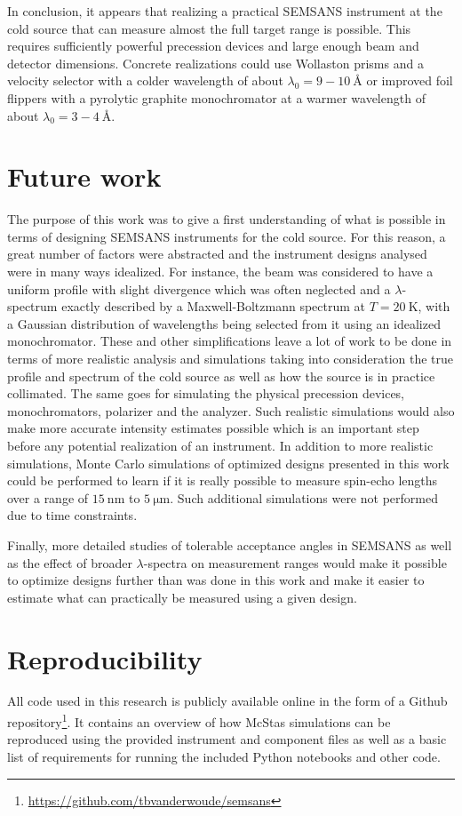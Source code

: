 In conclusion, it appears that realizing a practical SEMSANS instrument at the cold source that can measure almost the full target range is possible. This requires sufficiently powerful precession devices and large enough beam and detector dimensions. Concrete realizations could use Wollaston prisms and a velocity selector with a colder wavelength of about $\lambda_0 = 9 - 10~\unit{\angstrom}$ or improved foil flippers with a pyrolytic graphite monochromator at a warmer wavelength of about $\lambda_0 = 3 - 4~\unit{\angstrom}$.

\section{Future work}
The purpose of this work was to give a first understanding of what is possible in terms of designing SEMSANS instruments for the cold source. For this reason, a great number of factors were abstracted and the instrument designs analysed were in many ways idealized. For instance, the beam was considered to have a uniform profile with slight divergence which was often neglected and a $\lambda$-spectrum exactly described by a Maxwell-Boltzmann spectrum at $T= \SI{20}{\kelvin}$, with a Gaussian distribution of wavelengths being selected from it using an idealized monochromator. These and other simplifications leave a lot of work to be done in terms of more realistic analysis and simulations taking into consideration the true profile and spectrum of the cold source as well as how the source is in practice collimated. The same goes for simulating the physical precession devices, monochromators, polarizer and the analyzer. Such realistic simulations would also make more accurate intensity estimates possible which is an important step before any potential realization of an instrument. In addition to more realistic simulations, Monte Carlo simulations of optimized designs presented in this work could be performed to learn if it is really possible to measure spin-echo lengths over a range of $\SI{15}{\nano\meter}$ to $\SI{5}{\micro\meter}$. Such additional simulations were not performed due to time constraints.

Finally, more detailed studies of tolerable acceptance angles in SEMSANS as well as the effect of broader $\lambda$-spectra on measurement ranges would make it possible to optimize designs further than was done in this work and make it easier to estimate what can practically be measured using a given design.

\section{Reproducibility}
All code used in this research is publicly available online in the form of a Github repository\footnote{\url{https://github.com/tbvanderwoude/semsans}}. It contains an overview of how McStas simulations can be reproduced using the provided instrument and component files as well as a basic list of requirements for running the included Python notebooks and other code.